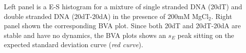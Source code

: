 \label{fig:bva_static}  Left panel is a E-S histogram for a mixture of single stranded DNA (20dT) and double stranded DNA (20dT-20dA) in the presence of 200mM MgCl$_2$. Right panel shown the corresponding BVA plot. Since both 20dT and 20dT-20dA are stable and have no dynamics, the BVA plots shows an $s_E$ peak sitting on the expected standard deviation curve (\textit{red curve}).